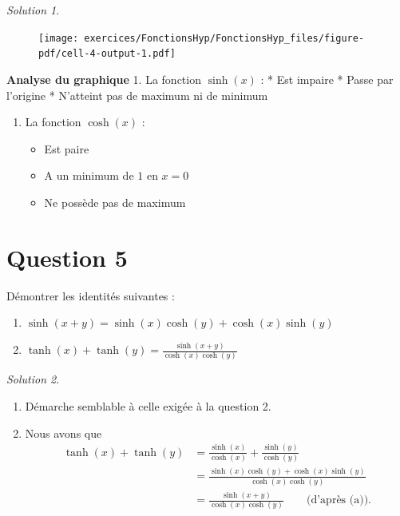 \documentclass[
  12pt,
  letterpaper,
]{book}
\providecommand{\tightlist}{%
  \setlength{\itemsep}{0pt}\setlength{\parskip}{0pt}}\usepackage{longtable,booktabs,array}
\theoremstyle{remark}
\newtheorem*{solution}{Solution}
\begin{document}
\begin{solution}
\begin{figure}[H]
{\centering \texttt{[image: exercices/FonctionsHyp/FonctionsHyp\_files/figure-pdf/cell-4-output-1.pdf]}

}

\end{figure}

\textbf{Analyse du graphique} 1. La fonction \(\sinh(x)\) : * Est
impaire * Passe par l'origine * N'atteint pas de maximum ni de minimum

\begin{enumerate}
\def\labelenumi{\arabic{enumi}.}
\setcounter{enumi}{1}
\tightlist
\item
  La fonction \(\cosh(x)\) :

  \begin{itemize}
  \tightlist
  \item
    Est paire
  \item
    A un minimum de \(1\) en \(x = 0\)
  \item
    Ne possède pas de maximum
  \end{itemize}
\end{enumerate}

\end{solution}

\hypertarget{question-5-3}{%
\section{Question 5}\label{question-5-3}}

Démontrer les identités suivantes :

\begin{enumerate}
\item
  \(\sinh(x+y) = \sinh(x)\cosh(y) + \cosh(x)\sinh(y)\)
\item
  \(\tanh(x) + \tanh(y) = \frac{\sinh(x+y)}{\cosh(x)\cosh(y)}\)
\end{enumerate}

\begin{solution}

\begin{enumerate}
\item
  Démarche semblable à celle exigée à la question 2.
\item
  Nous avons que \begin{align}
  \tanh(x) + \tanh(y) &= \frac{\sinh(x)}{\cosh(x)} + \frac{\sinh(y)}{\cosh(y)}\\
  &= \frac{\sinh(x)\cosh(y) + \cosh(x)\sinh(y)}{\cosh(x)\cosh(y)}\\
  &= \frac{\sinh(x+y)}{\cosh(x)\cosh(y)}\qquad\text{(d'après (a)).}
  \end{align}
\end{enumerate}

\end{solution}
\end{document}
